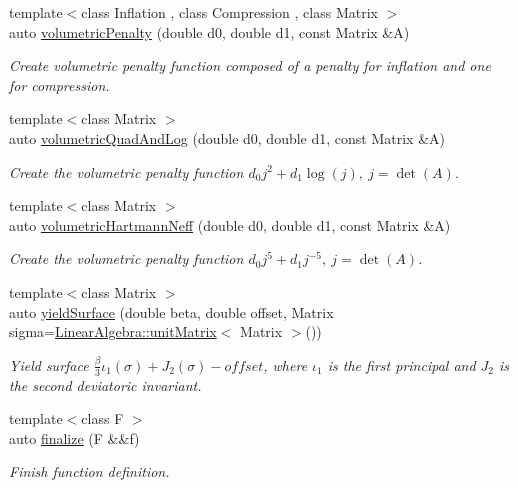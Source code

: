 \begin{DoxyCompactItemize}
{\footnotesize template$<$class Inflation , class Compression , class Matrix $>$ }\\auto \hyperlink{namespacefuncy_ad7b38a36bcc24177861b72ff8344e485}{volumetric\-Penalty} (double d0, double d1, const Matrix \&A)
\begin{DoxyCompactList}\small\item\em Create volumetric penalty function composed of a penalty for inflation and one for compression. \end{DoxyCompactList}\item 
{\footnotesize template$<$class Matrix $>$ }\\auto \hyperlink{namespacefuncy_ac40004b4dfa21588792d2986dcc840f4}{volumetric\-Quad\-And\-Log} (double d0, double d1, const Matrix \&A)
\begin{DoxyCompactList}\small\item\em Create the volumetric penalty function $ d_0 j^2 + d_1 \log(j),\ j=\det(A) $. \end{DoxyCompactList}\item 
{\footnotesize template$<$class Matrix $>$ }\\auto \hyperlink{namespacefuncy_a367b4ff89659b6d3b1c2fd54ce5b2d11}{volumetric\-Hartmann\-Neff} (double d0, double d1, const Matrix \&A)
\begin{DoxyCompactList}\small\item\em Create the volumetric penalty function $ d_0 j^5 + d_1 j^{-5},\ j=\det(A) $. \end{DoxyCompactList}\item 
{\footnotesize template$<$class Matrix $>$ }\\auto \hyperlink{namespacefuncy_a2868b162297651eb5666369ebc112d81}{yield\-Surface} (double beta, double offset, Matrix sigma=\hyperlink{group__LinearAlgebraGroup_ga04d388790cbcaac909faeb3b930c7ae7}{Linear\-Algebra\-::unit\-Matrix}$<$ Matrix $>$())
\begin{DoxyCompactList}\small\item\em Yield surface $ \frac{\beta}{3}\iota_1(\sigma) + J_2(\sigma)-offset $, where $\iota_1$ is the first principal and $J_2$ is the second deviatoric invariant. \end{DoxyCompactList}\item 
{\footnotesize template$<$class F $>$ }\\auto \hyperlink{namespacefuncy_a6e18ee3ccfed0acfdb6d17247a060bb3}{finalize} (F \&\&f)
\begin{DoxyCompactList}\small\item\em Finish function definition. \end{DoxyCompactList}\item 

\end{DoxyCompactItemize}

